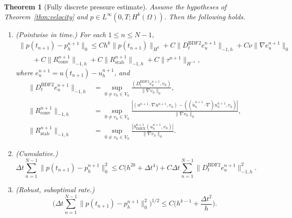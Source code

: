 \documentclass[11pt]{article}
\newtheorem{theorem}{Theorem}
\theoremstyle{remark}\newtheorem{remark}{Remark}
\newcommand{\Vh}{V_h}\newcommand{\Qh}{Q_h}
\newcommand{\Dt}{D_t^{\mathrm{BDF2}}}
\newcommand{\tu}{\tilde u_h}
\newcommand{\Simex}{S_{\mathrm{IMEX}}}
\theoremstyle{plain}
\newcommand{\new}[1]{{\color{blue}#1}}
\begin{document}
\begin{theorem}[Fully discrete pressure estimate]\label{thm:pressure}
Assume the hypotheses of Theorem~\ref{thm:velocity} and $p\in L^\infty(0,T;H^k(\Omega))$. \new{Then the following holds.}
\begin{enumerate}[label=(\roman*),itemsep=2pt]
\item \new{(Pointwise in time.)} For each $1\le n\le N-1$,
\begin{multline*}\|p(t_{n+1})-p_h^{n+1}\|_0\le Ch^k\|p(t_{n+1})\|_{H^k}+C\|\Dt e_u^{n+1}\|_{-1,h}+C\nu\|\nabla e_u^{n+1}\|_0\\
\qquad +C\|R_{\mathrm{conv}}^{n+1}\|_{-1,h}+C\|R_{\mathrm{stab}}^{n+1}\|_{-1,h}+C\|\tau^{n+1}\|_{H^{-1}},
\end{multline*}
where $e_u^{n+1}=u(t_{n+1})-u_h^{n+1}$, and
\begin{align*}
\|\Dt e_u^{n+1}\|_{-1,h}&=\sup_{0\ne v_h\in\Vh}\frac{(\Dt e_u^{n+1},v_h)}{\|\nabla v_h\|_0},\\
\|R^{n+1}_{\mathrm{conv}}\|_{-1,h}&=\sup_{0\ne v_h\in\Vh}\frac{|(u^{n+1}\cdot\nabla u^{n+1},v_h)-((\tu^{n+1}\cdot\nabla)u_h^{n+1},v_h)|}{\|\nabla v_h\|_0},\\
\|R^{n+1}_{\mathrm{stab}}\|_{-1,h}&=\sup_{0\ne v_h\in\Vh}\frac{|\Simex^{n+1}(u_h^{n+1},v_h)|}{\|\nabla v_h\|_0}.
\end{align*}
\item \new{(Cumulative.)}
\[\Delta t\sum_{n=1}^{N-1}\|p(t_{n+1})-p_h^{n+1}\|_0^2\le C\big(h^{2k}+\Delta t^4\big)+C\Delta t\sum_{n=1}^{N-1}\|\Dt e_u^{n+1}\|_{-1,h}^2.\]
\item \new{(Robust, suboptimal rate.)}
\[\Big(\Delta t\sum_{n=1}^{N-1}\|p(t_{n+1})-p_h^{n+1}\|_0^2\Big)^{1/2}\le C\Big(h^{k-1}+\frac{\Delta t^2}{h}\Big).\]
\end{enumerate}
\end{theorem}
\end{document}
